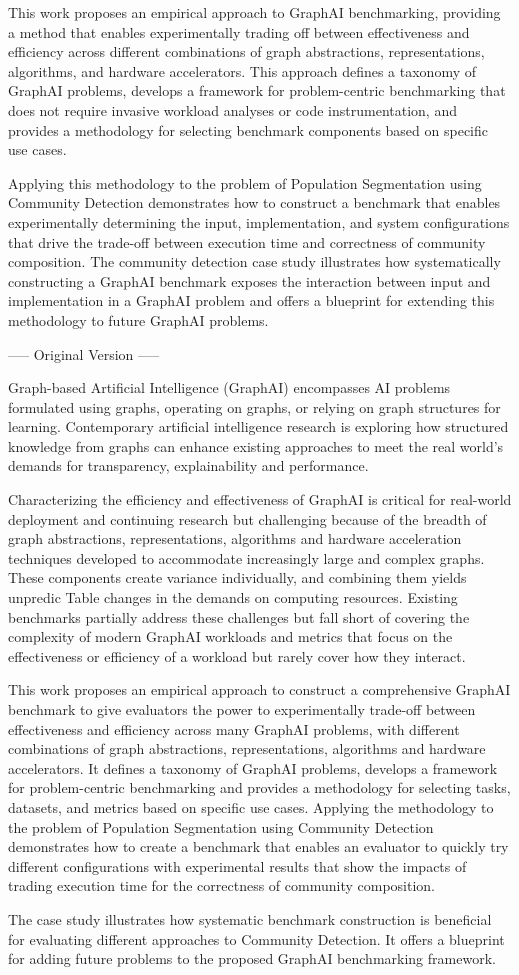 This work proposes an empirical approach to GraphAI benchmarking, providing a method that enables experimentally trading off between effectiveness and efficiency across different combinations of graph abstractions, representations, algorithms, and hardware accelerators. This approach defines a taxonomy of GraphAI problems, develops a framework for problem-centric benchmarking that does not require invasive workload analyses or code instrumentation, and provides a methodology for selecting benchmark components based on specific use cases. 

Applying this methodology to the problem of Population Segmentation using Community Detection demonstrates how to construct a benchmark that enables experimentally determining the input, implementation, and system configurations that drive the trade-off between execution time and correctness of community composition. The community detection case study illustrates how systematically constructing a GraphAI benchmark exposes the interaction between input and implementation in a GraphAI problem and offers a blueprint for extending this methodology to future GraphAI problems.


----- Original Version -----

Graph-based Artificial Intelligence (GraphAI) encompasses AI problems formulated using graphs, operating on graphs, or relying on graph structures for learning. Contemporary artificial intelligence research is exploring how structured knowledge from graphs can enhance existing approaches to meet the real world's demands for transparency, explainability and performance.

Characterizing the efficiency and effectiveness of GraphAI is critical for real-world deployment and continuing research but challenging because of the breadth of graph abstractions, representations, algorithms and hardware acceleration techniques developed to accommodate increasingly large and complex graphs. These components create variance individually, and combining them yields unpredic Table changes in the demands on computing resources. Existing benchmarks partially address these challenges but fall short of covering the complexity of modern GraphAI workloads and metrics that focus on the effectiveness or efficiency of a workload but rarely cover how they interact.

This work proposes an empirical approach to construct a comprehensive GraphAI benchmark to give evaluators the power to experimentally trade-off between effectiveness and efficiency across many GraphAI problems, with different combinations of graph abstractions, representations, algorithms and hardware accelerators. It defines a taxonomy of GraphAI problems, develops a framework for problem-centric benchmarking and provides a methodology for selecting tasks, datasets, and metrics based on specific use cases. Applying the methodology to the problem of Population Segmentation using Community Detection demonstrates how to create a benchmark that enables an evaluator to quickly try different configurations with experimental results that show the impacts of trading execution time for the correctness of community composition.

The case study illustrates how systematic benchmark construction is beneficial for evaluating different approaches to Community Detection. It offers a blueprint for adding future problems to the proposed GraphAI benchmarking framework. 